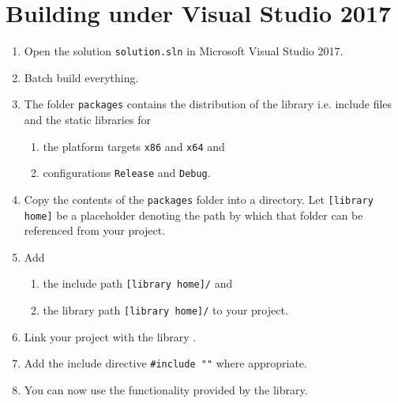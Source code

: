 %
%
%
%
%
%
%

\chapter{Building under Visual Studio 2017}
\begin{enumerate}
\item Open the solution \texttt{solution.sln} in Microsoft Visual Studio 2017.
\item Batch build everything.
\item The folder \texttt{packages} contains the distribution of the library i.e. include files and the
      static libraries for
  \begin{enumerate}
    \item the platform targets \texttt{x86} and \texttt{x64} and
    \item configurations \texttt{Release} and \texttt{Debug}.
  \end{enumerate}
\item Copy the contents of the \verb+packages+ folder into a directory. Let
      \verb+[library home]+ be a placeholder denoting the path by which that folder
      can be referenced from your project.
\item Add
  \begin{enumerate}
    \item the include path
\texttt{[library home]/\GetLibraryIncludesDirectoryPath}
	and
    \item the library path
\texttt{[library home]/\GetLibraryStaticLibrariesDirectoryPath}
    to your project.
\end{enumerate}
\item Link your project with the library \texttt{\GetLibraryStaticLibraryFileName}.
\item Add the include directive \texttt{\#include "{}\GetLibraryIncludeDirectiveFilePath"{}} where appropriate.
\item You can now use the functionality provided by the library.
\end{enumerate}
